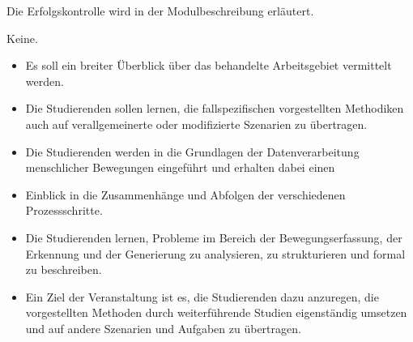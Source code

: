 \begin{course}

\setdoclanguagegerman
{}



\coursehead


\label{cour_7019.dp_997}


\begin{styleenv}
\begin{assessment}
Die Erfolgskontrolle wird in der Modulbeschreibung erläutert.


\end{assessment}

\begin{conditions}Keine.\end{conditions}


\end{styleenv}

\begin{learningoutcomes}
\begin{itemize}\item Es soll ein breiter Überblick über das behandelte Arbeitsgebiet vermittelt werden.  \item Die Studierenden sollen lernen, die fallspezifischen vorgestellten Methodiken auch auf verallgemeinerte oder modifizierte Szenarien zu übertragen.  \item Die Studierenden werden in die Grundlagen der Datenverarbeitung menschlicher Bewegungen eingeführt und erhalten dabei einen  \item Einblick in die Zusammenhänge und Abfolgen der verschiedenen Prozessschritte.  \item Die Studierenden lernen, Probleme im Bereich der Bewegungserfassung, der Erkennung und der Generierung zu analysieren, zu strukturieren und formal zu beschreiben.  \item Ein Ziel der Veranstaltung ist es, die Studierenden dazu anzuregen, die vorgestellten Methoden durch weiterführende Studien eigenständig umsetzen und auf andere Szenarien und Aufgaben zu übertragen.  \end{itemize}
\end{learningoutcomes}


\end{course}
